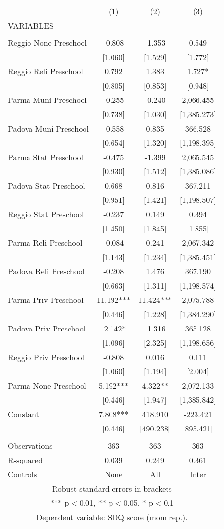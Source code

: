 \begin{tabular}{lccc} \hline
 & (1) & (2) & (3) \\
VARIABLES &  &  &  \\ \hline
 &  &  &  \\
Reggio None Preschool & -0.808 & -1.353 & 0.549 \\
 & [1.060] & [1.529] & [1.772] \\
Reggio Reli Preschool & 0.792 & 1.383 & 1.727* \\
 & [0.805] & [0.853] & [0.948] \\
Parma Muni Preschool & -0.255 & -0.240 & 2,066.455 \\
 & [0.738] & [1.030] & [1,385.273] \\
Padova Muni Preschool & -0.558 & 0.835 & 366.528 \\
 & [0.654] & [1.320] & [1,198.395] \\
Parma Stat Preschool & -0.475 & -1.399 & 2,065.545 \\
 & [0.930] & [1.512] & [1,385.086] \\
Padova Stat Preschool & 0.668 & 0.816 & 367.211 \\
 & [0.951] & [1.421] & [1,198.507] \\
Reggio Stat Preschool & -0.237 & 0.149 & 0.394 \\
 & [1.450] & [1.845] & [1.855] \\
Parma Reli Preschool & -0.084 & 0.241 & 2,067.342 \\
 & [1.143] & [1.234] & [1,385.451] \\
Padova Reli Preschool & -0.208 & 1.476 & 367.190 \\
 & [0.663] & [1.311] & [1,198.574] \\
Parma Priv Preschool & 11.192*** & 11.424*** & 2,075.788 \\
 & [0.446] & [1.228] & [1,384.290] \\
Padova Priv Preschool & -2.142* & -1.316 & 365.128 \\
 & [1.096] & [2.325] & [1,198.656] \\
Reggio Priv Preschool & -0.808 & 0.016 & 0.111 \\
 & [1.060] & [1.194] & [2.004] \\
Parma None Preschool & 5.192*** & 4.322** & 2,072.133 \\
 & [0.446] & [1.947] & [1,385.842] \\
Constant & 7.808*** & 418.910 & -223.421 \\
 & [0.446] & [490.238] & [895.421] \\
 &  &  &  \\
Observations & 363 & 363 & 363 \\
R-squared & 0.039 & 0.249 & 0.361 \\
 Controls & None & All & Inter \\ \hline
\multicolumn{4}{c}{ Robust standard errors in brackets} \\
\multicolumn{4}{c}{ *** p$<$0.01, ** p$<$0.05, * p$<$0.1} \\
\multicolumn{4}{c}{ Dependent variable: SDQ score (mom rep.).} \\
\end{tabular}

